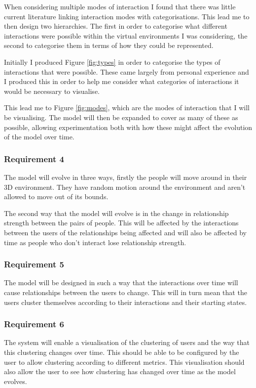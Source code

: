 \documentclass[12pt,a4paper]{article}
\begin{document}
When considering multiple modes of interaction I found that there was little current literature linking interaction modes with categorisations. This lead me to then design two hierarchies. The first in order to categorise what different interactions were possible within the virtual environments I was considering, the second to categorise them in terms of how they could be represented.

Initially I produced Figure \ref{fig:types} in order to categorise the types of interactions that were possible. These came largely from personal experience and I produced this in order to help me consider what categories of interactions it would be necessary to visualise.

This lead me to Figure \ref{fig:modes}, which are the modes of interaction that I will be visualising. The model will then be expanded to cover as many of these as possible, allowing experimentation both with how these might affect the evolution of the model over time.

\subsubsection{Requirement 4}
The model will evolve in three ways, firstly the people will move around in their 3D environment. They have random motion around the environment and aren't allowed to move out of its bounds.

The second way that the model will evolve is in the change in relationship strength between the pairs of people. This will be affected by the interactions between the users of the relationships being affected and will also be affected by time as people who don't interact lose relationship strength.

\subsubsection{Requirement 5}
The model will be designed in such a way that the interactions over time will cause relationships between the users to change. This will in turn mean that the users cluster themselves according to their interactions and their starting states.

\subsubsection{Requirement 6}
The system will enable a visualisation of the clustering of users and the way that this clustering changes over time. This should be able to be configured by the user to allow clustering according to different metrics. This visualisation should also allow the user to see how clustering has changed over time as the model evolves.
\end{document}
